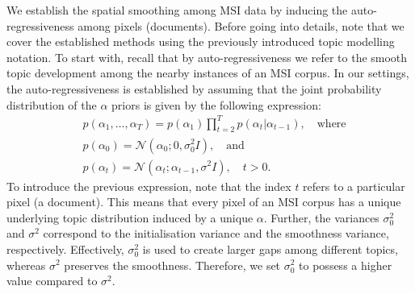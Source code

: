 \documentclass{mpaper}
\begin{document}
\par We establish the spatial smoothing among MSI data by inducing the auto-regressiveness among pixels (documents). Before going into details, note that we cover the established methods using the previously introduced topic modelling notation. To start with, recall that by auto-regressiveness we refer to the smooth topic development among the nearby instances of an MSI corpus. In our settings, the auto-regressiveness is established by assuming that the joint probability distribution of the $\alpha$ priors is given by the following expression:
\begin{align*}
&p(\alpha_1,\ldots,\alpha_T) =p(\alpha_1)\prod_{t=2}^{T}{p(\alpha_t|\alpha_{t-1})}, \quad \mbox{where}\\
&p(\alpha_0) =\mathcal{N} (\alpha_0; 0, \sigma_0^2I), \quad \mbox{and}\\
&p(\alpha_t) =\mathcal{N} (\alpha_t; \alpha_{t-1}, \sigma^2I), \quad t>0.
\end{align*}
To introduce the previous expression, note that the index $t$ refers to a particular pixel (a document). This means that every pixel of an MSI corpus has a unique underlying topic distribution induced by a unique $\alpha$. Further, the variances $\sigma_0^2$ and $\sigma^2$ correspond to the initialisation variance and the smoothness variance, respectively. Effectively, $\sigma_0^2$ is used to create larger gaps among different topics, whereas $\sigma^2$ preserves the smoothness. Therefore, we set $\sigma_0^2$ to possess a higher value compared to $\sigma^2$.
\end{document}
